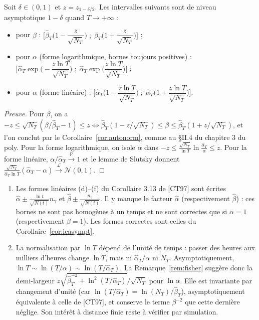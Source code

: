 \begin{corollaire}\label{cor:icasympt}
Soit $\delta\in(0,1)$ et $z=z_{1-\delta/2}$. Les intervalles suivants sont de niveau asymptotique $1-\delta$ quand $T\to+\infty$ :
\begin{itemize}
\item pour $\beta$ : $\Big[\hat\beta_T\Big(1-\dfrac{z}{\sqrt{N_T}}\Big)\;;\;\hat\beta_T\Big(1+\dfrac{z}{\sqrt{N_T}}\Big)\Big]$ ;
\item pour $\alpha$ (forme logarithmique, bornes toujours positives) : $\Big[\hat\alpha_T\exp\Big(-\dfrac{z\ln T}{\sqrt{N_T}}\Big)\;;\;\hat\alpha_T\exp\Big(\dfrac{z\ln T}{\sqrt{N_T}}\Big)\Big]$ ;
\item pour $\alpha$ (forme linéaire) : $\Big[\hat\alpha_T\Big(1-\dfrac{z\ln T}{\sqrt{N_T}}\Big)\;;\;\hat\alpha_T\Big(1+\dfrac{z\ln T}{\sqrt{N_T}}\Big)\Big]$.
\end{itemize}
\end{corollaire}

\begin{proof}[Preuve]
Pour $\beta$, on a $-z\le\sqrt{N_T}(\beta/\hat\beta_T-1)\le z\iff\hat\beta_T(1-z/\sqrt{N_T})\le\beta\le\hat\beta_T(1+z/\sqrt{N_T})$, et l'on conclut par le Corollaire~\ref{cor:autonorm}, comme au §II.4 du chapitre 3 du poly. Pour la forme logarithmique, on isole $\alpha$ dans $-z\le\frac{\sqrt{N_T}}{\ln T}\ln\frac{\hat\alpha_T}{\alpha}\le z$. Pour la forme linéaire, $\alpha/\hat\alpha_T\xrightarrow{\mathbb{P}}1$ et le lemme de Slutsky donnent $\frac{\sqrt{N_T}}{\hat\alpha_T\ln T}(\hat\alpha_T-\alpha)\xrightarrow{\mathcal{L}}\mathcal{N}(0,1)$.
\end{proof}

\begin{remarque}\label{rem:vigilance}
\begin{enumerate}
\item Les formes linéaires (d)--(f) du Corollaire 3.13 de [CT97] sont écrites $\hat\alpha\pm\frac{\ln t}{\sqrt{N(t)}}n_\gamma$ et $\hat\beta\pm\frac{n_\gamma}{\sqrt{N(t)}}$. Il y manque le facteur $\hat\alpha$ (respectivement $\hat\beta$) : ces bornes ne sont pas homogènes à un temps et ne sont correctes que si $\alpha=1$ (respectivement $\beta=1$). Les formes correctes sont celles du Corollaire~\ref{cor:icasympt}.
\item La normalisation par $\ln T$ dépend de l'unité de temps : passer des heures aux milliers d'heures change $\ln T$, mais ni $\hat\alpha_T/\alpha$ ni $N_T$. Asymptotiquement, $\ln T\sim\ln(T/\alpha)\sim\ln(T/\hat\alpha_T)$. La Remarque~\ref{rem:fisher} suggère donc la demi-largeur $z\sqrt{\hat\beta_T^{-2}+\ln^2(T/\hat\alpha_T)}/\sqrt{N_T}$ pour $\ln\alpha$. Elle est invariante par changement d'unité (car $\ln(T/\hat\alpha_T)=\ln(N_T)/\hat\beta_T$), asymptotiquement équivalente à celle de [CT97], et conserve le terme $\beta^{-2}$ que cette dernière néglige. Son intérêt à distance finie reste à vérifier par simulation.
\end{enumerate}
\end{remarque}


